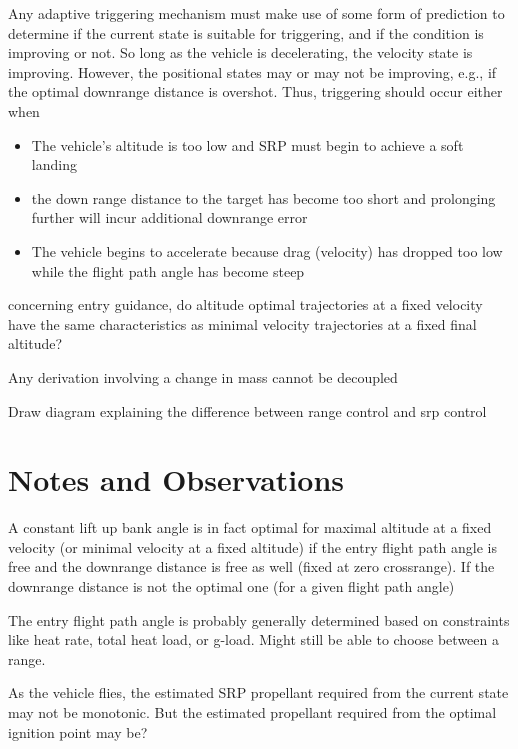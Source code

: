 \documentclass[]{article}
\begin{document}
Any adaptive triggering mechanism must make use of some form of prediction to determine if the current state is suitable for triggering, and if the condition is improving or not. So long as the vehicle is decelerating, the velocity state is improving. However, the positional states may or may not be improving, e.g., if the optimal downrange distance is overshot. Thus, triggering should occur either when 
\begin{itemize}
\item The vehicle's altitude is too low and SRP must begin to achieve a soft landing 
\item the down range distance to the target has become too short and prolonging further will incur additional downrange error
\item The vehicle begins to accelerate because drag (velocity) has dropped too low while the flight path angle has become steep 
\end{itemize}

concerning entry guidance, do altitude optimal trajectories at a fixed velocity have the same characteristics as minimal velocity trajectories at a fixed final altitude?

Any derivation involving a change in mass cannot be decoupled 


Draw diagram explaining the difference between range control and srp control


\section{Notes and Observations}
A constant lift up bank angle is in fact optimal for maximal altitude at a fixed velocity (or minimal velocity at a fixed altitude) if the entry flight path angle is free and the downrange distance is free as well (fixed at zero crossrange). If the downrange distance is not the optimal one (for a given flight path angle)

The entry flight path angle is probably generally determined based on constraints like heat rate, total heat load, or g-load. Might still be able to choose between a range. 

As the vehicle flies, the estimated SRP propellant required from the current state may not be monotonic. But the estimated propellant required from the optimal ignition point may be? 
\end{document}
